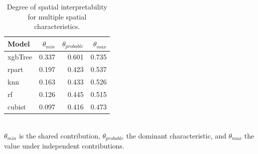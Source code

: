 \begin{table}[htbp]
\centering
\caption{Degree of spatial interpretability for multiple spatial characteristics.}
\label{tab:theta}
\begin{tabular}{lrrr}
\hline
\textbf{Model} & \textbf{$\theta_{min}$} & \textbf{$\theta_{probable}$} & \textbf{$\theta_{max}$} \\
\hline
xgbTree & 0.337 & 0.601 & 0.735 \\
rpart & 0.197 & 0.423 & 0.537 \\
knn & 0.163 & 0.433 & 0.526 \\
rf & 0.126 & 0.445 & 0.515 \\
cubist & 0.097 & 0.416 & 0.473 \\
\hline
\end{tabular}
\\[2pt]\footnotesize $\theta_{min}$ is the shared contribution, $\theta_{probable}$ the dominant characteristic, and $\theta_{max}$ the value under independent contributions.
\end{table}
